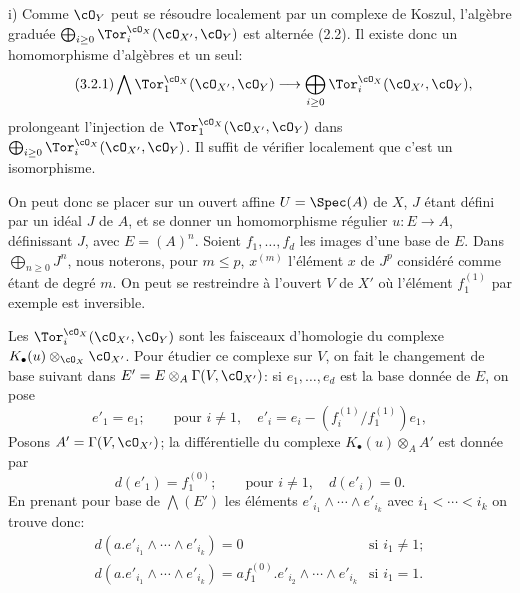 i)
Comme \(\cO_Y\) peut se résoudre localement par un complexe de Koszul, l'algèbre graduée \(\bigoplus_{i\ge0}\Tor_i^{\cO_X}(\cO_{X'},\cO_Y)\) est alternée (2.2). Il existe donc un homomorphisme d'algèbres et un seul:
\begin{equation}\tag{3.2.1}
\bigwedge \Tor_1^{\cO_X}(\cO_{X'},\cO_Y)
\longrightarrow
\bigoplus_{i\ge0}\Tor_i^{\cO_X}(\cO_{X'},\cO_Y),
\end{equation}
prolongeant l'injection de \(\Tor_1^{\cO_X}(\cO_{X'},\cO_Y)\) dans
\(\bigoplus_{i\ge0}\Tor_i^{\cO_X}(\cO_{X'},\cO_Y)\). Il suffit de vérifier localement que c'est un isomorphisme.

On peut donc se placer sur un ouvert affine \(U=\Spec(A)\) de \(X\), \(J\) étant défini par un idéal \(J\) de \(A\), et se donner un homomorphisme régulier \(u:E\to A\), définissant \(J\), avec \(E=(A)^n\). Soient \(f_1,\ldots,f_d\) les images d'une base de \(E\). Dans \(\bigoplus_{n\ge0}J^n\), nous noterons, pour \(m\le p\), \(x^{(m)}\) l'élément \(x\) de \(J^p\) considéré comme étant de degré \(m\). On peut se restreindre à l'ouvert \(V\) de \(X'\) où l'élément \(f_1^{(1)}\) par exemple est inversible.

Les \(\Tor_i^{\cO_X}(\cO_{X'},\cO_Y)\) sont les faisceaux d'homologie du complexe \(K_\bullet(u)\otimes_{\cO_X}\cO_{X'}\). Pour étudier ce complexe sur \(V\), on fait le changement de base suivant dans \(E'=E\otimes_A\Gamma(V,\cO_{X'})\): si \(e_1,\ldots,e_d\) est la base donnée de \(E\), on pose
\[
e'_1=e_1;\qquad \text{pour }i\ne1,\quad
e'_i=e_i-(f_i^{(1)}/f_1^{(1)})e_1,
\]
Posons \(A'=\Gamma(V,\cO_{X'})\); la différentielle du complexe \(K_\bullet(u)\otimes_A A'\) est donnée par
\[
d(e'_1)=f_1^{(0)};\qquad \text{pour }i\ne1,\quad d(e'_i)=0.
\]
En prenant pour base de \(\bigwedge(E')\) les éléments
\(e'_{i_1}\wedge\cdots\wedge e'_{i_k}\) avec \(i_1<\cdots<i_k\) on trouve donc:
\[
\begin{array}{ll}
d(a.e'_{i_1}\wedge\cdots\wedge e'_{i_k})=0
&\text{si }i_1\ne1;\\[3pt]
d(a.e'_{i_1}\wedge\cdots\wedge e'_{i_k})=
af_1^{(0)}.e'_{i_2}\wedge\cdots\wedge e'_{i_k}
&\text{si }i_1=1.
\end{array}
\]
